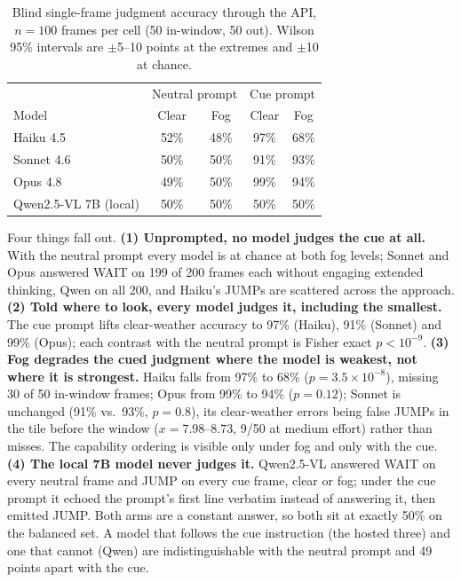 \documentclass[11pt]{article}
\begin{document}
\begin{table}[h]
  \centering
  \caption{Blind single-frame judgment accuracy through the API, $n = 100$
  frames per cell (50 in-window, 50 out). Wilson 95\% intervals are
  $\pm$5--10 points at the extremes and $\pm$10 at chance.}
  \label{tab:perception}
  \begin{tabular}{lcccc}
    \toprule
    & \multicolumn{2}{c}{Neutral prompt} & \multicolumn{2}{c}{Cue prompt} \\
    Model & Clear & Fog & Clear & Fog \\
    \midrule
    Haiku 4.5   & 52\% & 48\% & 97\% & 68\% \\
    Sonnet 4.6  & 50\% & 50\% & 91\% & 93\% \\
    Opus 4.8    & 49\% & 50\% & 99\% & 94\% \\
    Qwen2.5-VL 7B (local) & 50\% & 50\% & 50\% & 50\% \\
    \bottomrule
  \end{tabular}
\end{table}

Four things fall out. \textbf{(1) Unprompted, no model judges the cue at
all.} With the neutral prompt every model is at chance at both fog levels;
Sonnet and Opus answered WAIT on 199 of 200 frames each without engaging
extended thinking, Qwen on all 200, and Haiku's JUMPs are scattered across
the approach.
\textbf{(2) Told where to look, every model judges it, including the
smallest.} The cue prompt lifts clear-weather accuracy to 97\% (Haiku), 91\%
(Sonnet) and 99\% (Opus); each contrast with the neutral prompt is Fisher
exact $p < 10^{-9}$. \textbf{(3) Fog degrades the cued judgment where the
model is weakest, not where it is strongest.} Haiku falls from 97\% to 68\%
($p = 3.5 \times 10^{-8}$), missing 30 of 50 in-window frames; Opus from 99\%
to 94\% ($p = 0.12$); Sonnet is unchanged (91\% vs.\ 93\%, $p = 0.8$), its
clear-weather errors being false JUMPs in the tile before the window
($x = 7.98$--$8.73$, 9/50 at medium effort) rather than misses. The capability
ordering is visible only under fog and only with the cue. \textbf{(4) The
local 7B model never judges it.} Qwen2.5-VL answered WAIT on every neutral
frame and JUMP on every cue frame, clear or fog; under the cue prompt it
echoed the prompt's first line verbatim instead of answering it, then emitted
JUMP. Both arms are a constant answer, so both sit at exactly 50\% on the
balanced set. A model that follows the cue instruction (the hosted three)
and one that cannot (Qwen) are indistinguishable with the neutral prompt and
49 points apart with the cue.
\end{document}
